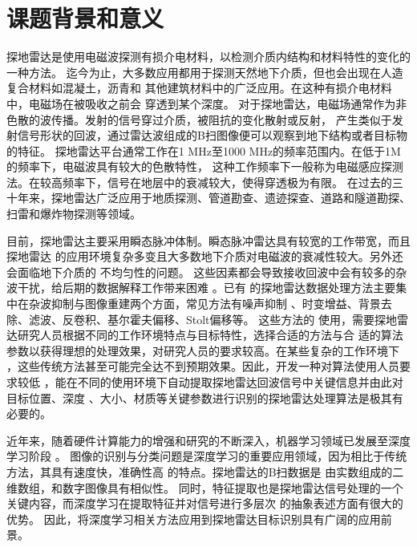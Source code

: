 \thesischapterexordium

\section{课题背景和意义}

探地雷达是使用电磁波探测有损介电材料，以检测介质内结构和材料特性的变化的一种方法。
迄今为止，大多数应用都用于探测天然地下介质，但也会出现在人造复合材料如混凝土，沥青和
其他建筑材料中的广泛应用。在这种有损介电材料中，电磁场在被吸收之前会
穿透到某个深度。
对于探地雷达，电磁场通常作为非色散的波传播。发射的信号穿过介质，被阻抗的变化散射或反射，
产生类似于发射信号形状的回波，通过雷达波组成的B扫图像便可以观察到地下结构或者目标物的特征。
探地雷达平台通常工作在1 MHz至1000 MHz的频率范围内。在低于1M的频率下，电磁波具有较大的色散特性，
这种工作频率下一般称为电磁感应探测法。在较高频率下，信号在地层中的衰减较大，使得穿透极为有限。
在过去的三十年来，探地雷达广泛应用于地质探测、管道勘查、遗迹探查、道路和隧道勘探、
扫雷和爆炸物探测等领域。

目前，探地雷达主要采用瞬态脉冲体制。瞬态脉冲雷达具有较宽的工作带宽，而且探地雷达
的应用环境复杂多变且大多数地下介质对电磁波的衰减性较大。另外还会面临地下介质的
不均匀性的问题。
这些因素都会导致接收回波中会有较多的杂波干扰，给后期的数据解释工作带来困难
。已有
的探地雷达数据处理方法主要集中在杂波抑制与图像重建两个方面，常见方法有噪声抑制
、时变增益、背景去除、滤波、反卷积、基尔霍夫偏移、Stolt偏移等。
这些方法的
使用，需要探地雷达研究人员根据不同的工作环境特点与目标特性，选择合适的方法与合
适的算法参数以获得理想的处理效果，对研究人员的要求较高。在某些复杂的工作环境下
，这些传统方法甚至可能完全达不到预期效果。因此，开发一种对算法使用人员要求较低
，能在不同的使用环境下自动提取探地雷达回波信号中关键信息并由此对目标位置、深度
、大小、材质等关键参数进行识别的探地雷达处理算法是极其有必要的。

近年来，随着硬件计算能力的增强和研究的不断深入，机器学习领域已发展至深度学习阶段
。
图像的识别与分类问题是深度学习的重要应用领域，因为相比于传统方法，其具有速度快，准确性高
的特点。探地雷达的B扫数据是
由实数组成的二维数组，和数字图像具有相似性。
同时，特征提取也是探地雷达信号处理的一个关键内容，而深度学习在提取特征并对信号进行多层次
的抽象表述方面有很大的优势。
因此，将深度学习相关方法应用到探地雷达目标识别具有广阔的应用前景。


